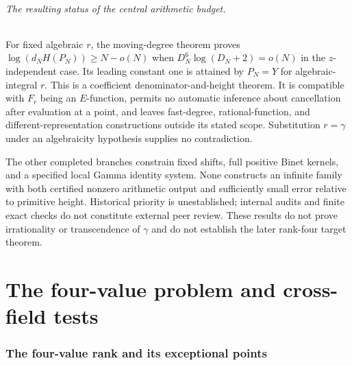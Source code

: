 \documentclass[11pt,a4paper]{article}
\theoremstyle{definition}
\theoremstyle{remark}
\theoremstyle{plain}
\numberwithin{equation}{section}
\begin{document}
\paragraph{The resulting status of the central arithmetic budget.}
For fixed algebraic $r$, the moving-degree theorem proves
$\log(d_NH(P_N))\ge N-o(N)$ when
$D_N^6\log(D_N+2)=o(N)$ in the $z$-independent case. Its leading
constant one is attained by $P_N=Y$ for algebraic-integral $r$.
This is a coefficient denominator-and-height theorem. It is compatible
with $F_r$ being an $E$-function, permits no automatic inference about
cancellation after evaluation at a point, and leaves fast-degree,
rational-function, and different-representation constructions outside
its stated scope. Substitution $r=\gamma$ under an algebraicity
hypothesis supplies no contradiction.

The other completed branches constrain fixed shifts, full positive
Binet kernels, and a specified local Gamma identity system. None
constructs an infinite family with both certified nonzero arithmetic
output and sufficiently small error relative to primitive height.
Historical priority is unestablished; internal audits and finite exact
checks do not constitute external peer review. These results do not
prove irrationality or transcendence of $\gamma$ and do not establish
the later rank-four target theorem.


\clearpage
\part{The four-value problem and cross-field tests}

\section{The four-value rank and its exceptional points}\label{rc:sec:rank}
\end{document}
